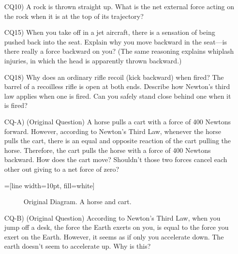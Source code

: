 \documentclass[10pt,twocolumn]{exam}
\begin{document}
\begin{questions}
\begin{enumerate}
    \pagebreak
    \vspace*{2.9em}

    \item[CQ10)] A rock is thrown straight up. What is the net external force acting on the rock when it is at the top of its trajectory?
    \item[CQ15)] When you take off in a jet aircraft, there is a sensation of being pushed back into the seat. Explain why you move backward in the seat—is there really a force backward on you? (The same reasoning explains whiplash injuries, in which the head is apparently thrown backward.)
    \item[CQ18)] Why does an ordinary rifle recoil (kick backward) when fired? The barrel of a recoilless rifle is open at both ends. Describe how Newton's third law applies when one is fired. Can you safely stand close behind one when it is fired?
    \item[CQ-A)] (Original Question) A horse pulls a cart with a force of 400 Newtons forward.  However, according to Newton's Third Law, whenever the horse pulls the cart, there is an equal and opposite reaction of the cart pulling the horse.  Therefore, the cart pulls the horse with a force of 400 Newtons backward.  How does the cart move?  Shouldn't those two forces cancel each other out giving to a net force of zero?

    =[line width=10pt, fill=white]

    \begin{figure}[ht]
      \centering
      \renewcommand{\thefigure}{A}
      \caption{Original Diagram. A horse and cart.}
    \end{figure}

    \item[CQ-B)] (Original Question) According to Newton's Third Law, when you jump off a desk, the force the Earth exerts on you, is equal to the force you exert on the Earth. However, it seems as if only you accelerate down. The earth doesn't seem to accelerate up. Why is this?
  \end{enumerate}


\end{questions}
\end{document}
